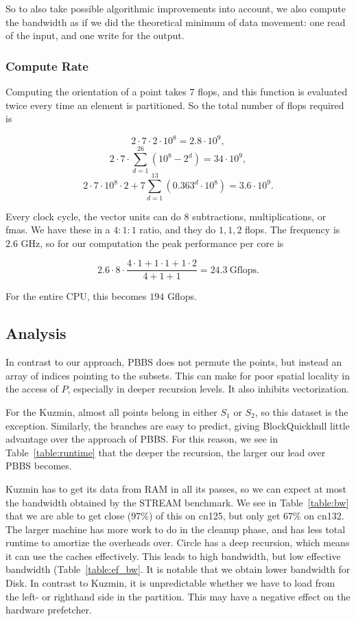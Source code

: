 So to also take possible algorithmic improvements into account,
we also compute the bandwidth as if we did the theoretical minimum of
data movement: one read of the input, and one write for the output.

\subsubsection{Compute Rate}

Computing the orientation of a point takes $7$ flops, and this function is
evaluated twice every time an element is partitioned. So the total number of
flops required is

$$2 \cdot 7 \cdot 2 \cdot 10^8 = 2.8 \cdot 10^9,$$ 
$$2 \cdot 7 \cdot \sum_{d = 1}^{26} (10^8 - 2^d) = 34 \cdot 10^9,$$
$$2 \cdot 7 \cdot 10^8 \cdot 2 + 7 \sum_{d = 1}^{13} \left(0.363^d \cdot 
10^8 \right)  = 3.6 \cdot 10^9.$$

Every clock cycle, the vector units can do $8$ subtractions, multiplications, 
or fmas. We have these in a $4:1:1$ ratio, and they do $1, 1, 2$
flops. The frequency is $2.6$ GHz, so for our computation the peak performance
per core is

$$2.6 \cdot 8 \cdot \frac{4 \cdot 1 + 1 \cdot 1 + 1 \cdot 2}{4 + 1 + 1} = 24.3 
        \ \text{Gflops}.$$

For the entire CPU, this becomes $194$ Gflops.

\subsection{Analysis}

In contrast to our approach, PBBS does not permute the points, but instead
an array of indices pointing to the subsets. This can make for poor spatial
locality in the access of $P$, especially in deeper recursion levels.
It also inhibits vectorization.

For the Kuzmin, almost all points belong in either $S_1$ or $S_2$, so
this dataset is the exception. Similarly, the branches are easy to predict,
giving BlockQuickhull little advantage over the approach of
PBBS. For this reason, we see in Table~\ref{table:runtime} that the deeper
the recursion, the larger our lead over PBBS becomes. 

Kuzmin has to get its data from RAM in all its passes, so we can expect
at most the bandwidth obtained by the STREAM benchmark. We see in 
Table~\ref{table:bw} that we are able to get close ($97\%$) of this 
on cn125, but only get $67\%$ on cn132. The larger machine has more work to do 
in the cleanup phase, and has less total runtime to amortize the overheads over. 
Circle has a deep recursion, which means it can use the caches effectively. This
leads to high bandwidth, but low effective bandwidth (Table~\ref{table:ef_bw}.
It is notable that we obtain lower bandwidth for Disk. In contrast to Kuzmin,
it is unpredictable whether we have to load from the left- or righthand side
in the partition. This may have a negative effect on the hardware prefetcher.

